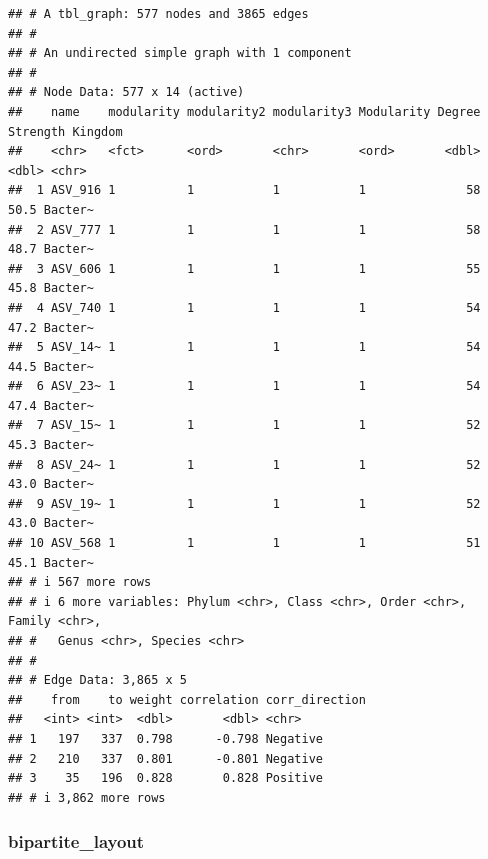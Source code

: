 \documentclass[
]{book}
\newenvironment{Shaded}{\begin{snugshade}}{\end{snugshade}}
\newcommand{\AttributeTok}[1]{\textcolor[rgb]{0.13,0.29,0.53}{#1}}
\newcommand{\FunctionTok}[1]{\textcolor[rgb]{0.13,0.29,0.53}{\textbf{#1}}}
\newcommand{\NormalTok}[1]{#1}
\newcommand{\OtherTok}[1]{\textcolor[rgb]{0.56,0.35,0.01}{#1}}
\newcommand{\SpecialCharTok}[1]{\textcolor[rgb]{0.81,0.36,0.00}{\textbf{#1}}}
\newcommand{\StringTok}[1]{\textcolor[rgb]{0.31,0.60,0.02}{#1}}
\begin{document}
\begin{Shaded}
\end{Shaded}

\begin{verbatim}
## # A tbl_graph: 577 nodes and 3865 edges
## #
## # An undirected simple graph with 1 component
## #
## # Node Data: 577 x 14 (active)
##    name    modularity modularity2 modularity3 Modularity Degree Strength Kingdom
##    <chr>   <fct>      <ord>       <chr>       <ord>       <dbl>    <dbl> <chr>  
##  1 ASV_916 1          1           1           1              58     50.5 Bacter~
##  2 ASV_777 1          1           1           1              58     48.7 Bacter~
##  3 ASV_606 1          1           1           1              55     45.8 Bacter~
##  4 ASV_740 1          1           1           1              54     47.2 Bacter~
##  5 ASV_14~ 1          1           1           1              54     44.5 Bacter~
##  6 ASV_23~ 1          1           1           1              54     47.4 Bacter~
##  7 ASV_15~ 1          1           1           1              52     45.3 Bacter~
##  8 ASV_24~ 1          1           1           1              52     43.0 Bacter~
##  9 ASV_19~ 1          1           1           1              52     43.0 Bacter~
## 10 ASV_568 1          1           1           1              51     45.1 Bacter~
## # i 567 more rows
## # i 6 more variables: Phylum <chr>, Class <chr>, Order <chr>, Family <chr>,
## #   Genus <chr>, Species <chr>
## #
## # Edge Data: 3,865 x 5
##    from    to weight correlation corr_direction
##   <int> <int>  <dbl>       <dbl> <chr>         
## 1   197   337  0.798      -0.798 Negative      
## 2   210   337  0.801      -0.801 Negative      
## 3    35   196  0.828       0.828 Positive      
## # i 3,862 more rows
\end{verbatim}

\subsubsection{bipartite\_layout}\label{bipartite_layout}

\begin{Shaded}
\end{Shaded}
\end{document}
